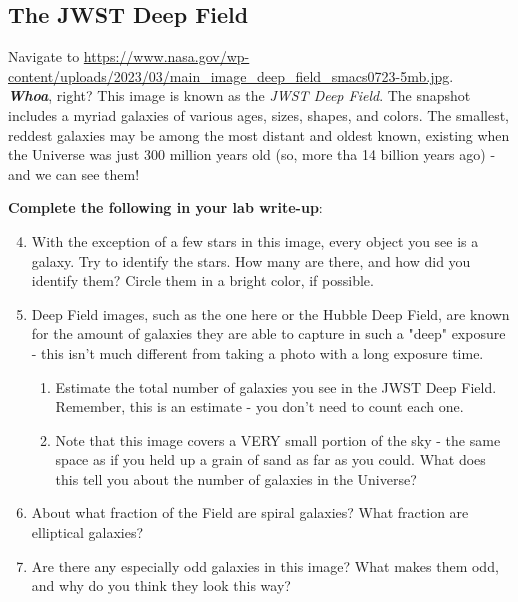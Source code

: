 \documentclass[11pt]{article}
\begin{document}
\subsection{The JWST Deep Field}

Navigate to \url{https://www.nasa.gov/wp-content/uploads/2023/03/main_image_deep_field_smacs0723-5mb.jpg}. \\\textbf{\textit{Whoa}}, right? This image is known as the \textit{JWST Deep Field}. The snapshot includes a myriad galaxies of various ages, sizes, shapes, and colors. The smallest, reddest galaxies may be among the most distant and oldest known, existing when the Universe was just 300 million years old (so, more tha 14 billion years ago) - and we can see them!

\medskip \noindent
\textbf{Complete the following in your lab write-up}:
\begin{enumerate}
\setcounter{enumi}{3}
    \item With the exception of a few stars in this image, every object you see is a galaxy. Try to identify the stars. How many are there, and how did you identify them? Circle them in a bright color, if possible.
    
    \item Deep Field images, such as the one here or the Hubble Deep Field, are known for the amount of galaxies they are able to capture in such a "deep" exposure - this isn't much different from taking a photo with a long exposure time. 
    \begin{enumerate}
        \item Estimate the total number of galaxies you see in the JWST Deep Field.  Remember, this is an estimate - you don't need to count each one. 

        \item Note that this image covers a VERY small portion of the sky - the same space as if you held up a grain of sand as far as you could. What does this tell you about the number of galaxies in the Universe? 
        
    \end{enumerate}
    
    \item About what fraction of the Field are spiral galaxies? What fraction are elliptical galaxies?

    \item Are there any especially odd galaxies in this image? What makes them odd, and why do you think they look this way?

\end{enumerate}
\end{document}
